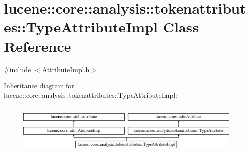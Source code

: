 \hypertarget{classlucene_1_1core_1_1analysis_1_1tokenattributes_1_1TypeAttributeImpl}{}\section{lucene\+:\+:core\+:\+:analysis\+:\+:tokenattributes\+:\+:Type\+Attribute\+Impl Class Reference}
\label{classlucene_1_1core_1_1analysis_1_1tokenattributes_1_1TypeAttributeImpl}


{\ttfamily \#include $<$Attribute\+Impl.\+h$>$}

Inheritance diagram for lucene\+:\+:core\+:\+:analysis\+:\+:tokenattributes\+:\+:Type\+Attribute\+Impl\+:\begin{figure}[H]
\begin{center}
\leavevmode
\includegraphics[height=2.530120cm]{classlucene_1_1core_1_1analysis_1_1tokenattributes_1_1TypeAttributeImpl}
\end{center}
\end{figure}
